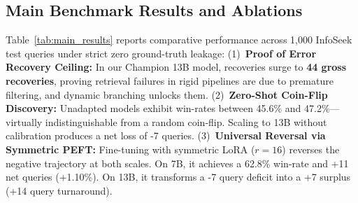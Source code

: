 \documentclass[conference]{IEEEtran}
\begin{document}
\subsection{Main Benchmark Results and Ablations}
Table~\ref{tab:main_results} reports comparative performance across 1,000 InfoSeek test queries under strict zero ground-truth leakage:
(1)~\textbf{Proof of Error Recovery Ceiling:} In our Champion 13B model, recoveries surge to \textbf{44 gross recoveries}, proving retrieval failures in rigid pipelines are due to premature filtering, and dynamic branching unlocks them.
(2)~\textbf{Zero-Shot Coin-Flip Discovery:} Unadapted models exhibit win-rates between 45.6\% and 47.2\%---virtually indistinguishable from a random coin-flip. Scaling to 13B without calibration produces a net loss of -7 queries.
(3)~\textbf{Universal Reversal via Symmetric PEFT:} Fine-tuning with symmetric LoRA ($r=16$) reverses the negative trajectory at both scales. On 7B, it achieves a 62.8\% win-rate and +11 net queries (+1.10\%). On 13B, it transforms a -7 query deficit into a +7 surplus (+14 query turnaround).

\begin{table}[!htbp]
\caption{Main Results Across 1,000 InfoSeek Test Queries}
\label{tab:main_results}
\centering
{}
\end{table}
\end{document}
